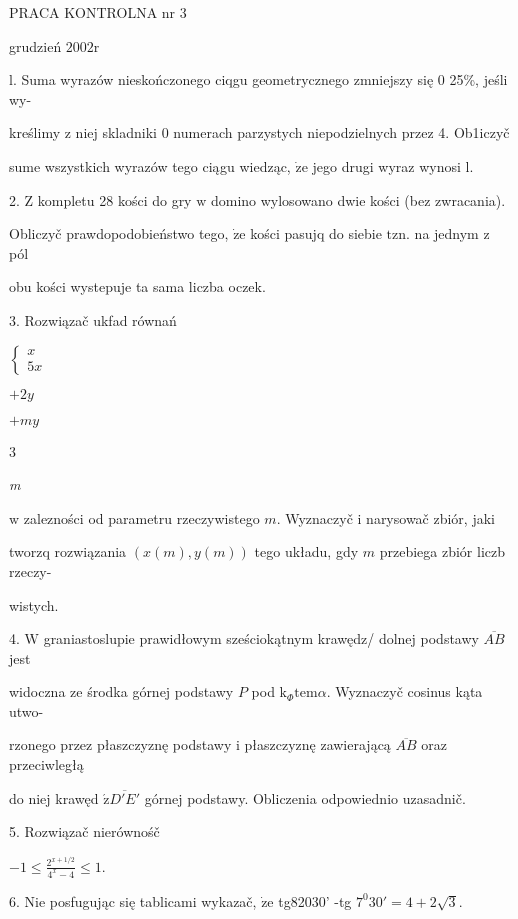 \documentclass[a4paper,12pt]{article}
\begin{document}
PRACA KONTROLNA nr 3

grudzień $2002\mathrm{r}$

l. Suma wyrazów nieskończonego ciqgu geometrycznego zmniejszy się $0$ 25\%, jeśli wy-

kreślimy $\mathrm{z}$ niej skladniki $0$ numerach parzystych niepodzielnych przez 4. Ob1iczyč

sume wszystkich wyrazów tego ciągu wiedząc, $\dot{\mathrm{z}}\mathrm{e}$ jego drugi wyraz wynosi l.

2. $\mathrm{Z}$ kompletu 28 kości do gry $\mathrm{w}$ domino wylosowano dwie kości (bez zwracania).

Obliczyč prawdopodobieństwo tego, $\dot{\mathrm{z}}\mathrm{e}$ kości pasujq do siebie $\mathrm{t}\mathrm{z}\mathrm{n}$. na jednym $\mathrm{z}$ pól

obu kości wystepuje ta sama liczba oczek.

3. Rozwiązač ukfad równań

$\left\{\begin{array}{l}
x\\
5x
\end{array}\right.$

$+2y$

$+my$

3

{\it m}

$\mathrm{w}$ zalezności od parametru rzeczywistego $m$. Wyznaczyč $\mathrm{i}$ narysowač zbiór, jaki

tworzq rozwiązania $(x(m),y(m))$ tego układu, gdy $m$ przebiega zbiór liczb rzeczy-

wistych.

4. $\mathrm{W}$ graniastoslupie prawidłowym sześciokątnym krawędz/ dolnej podstawy $\overline{AB}$ jest

widoczna ze środka górnej podstawy $P$ pod $\mathrm{k}_{\Phi}\mathrm{t}\mathrm{e}\mathrm{m}\alpha$. Wyznaczyč cosinus kąta utwo-

rzonego przez płaszczyznę podstawy $\mathrm{i}$ płaszczyznę zawierającą $\overline{AB}$ oraz przeciwległą

do niej krawęd $\acute{\mathrm{z}}\overline{D'E'}$ górnej podstawy. Obliczenia odpowiednio uzasadnič.

5. Rozwiązač nierównośč

$-1\displaystyle \leq\frac{2^{x+1/2}}{4^{x}-4}\leq 1.$

6. Nie posfugując się tablicami wykazač, $\dot{\mathrm{z}}\mathrm{e}$ tg82030' -tg $7^{0}30'=4+2\sqrt{3}.$
\end{document}
